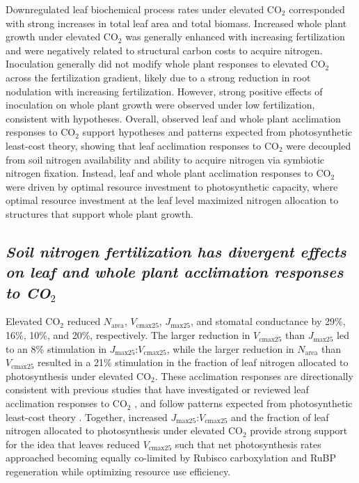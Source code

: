 Downregulated leaf biochemical process rates under elevated CO$_2$ corresponded with strong increases in total leaf area and total biomass. Increased whole plant growth under elevated CO$_2$ was generally enhanced with increasing fertilization and were negatively related to structural carbon costs to acquire nitrogen. Inoculation generally did not modify whole plant responses to elevated CO$_2$ across the fertilization gradient, likely due to a strong reduction in root nodulation with increasing fertilization. However, strong positive effects of inoculation on whole plant growth were observed under low fertilization, consistent with hypotheses. Overall, observed leaf and whole plant acclimation responses to CO$_2$ support hypotheses and patterns expected from photosynthetic least-cost theory, showing that leaf acclimation responses to CO$_2$ were decoupled from soil nitrogen availability and ability to acquire nitrogen via symbiotic nitrogen fixation. Instead, leaf and whole plant acclimation responses to CO$_2$ were driven by optimal resource investment to photosynthetic capacity, where optimal resource investment at the leaf level maximized nitrogen allocation to structures that support whole plant growth.

\begin{singlespace}
    \subsection{\textit{Soil nitrogen fertilization has divergent effects on leaf and whole plant acclimation responses to CO$_2$}}
\end{singlespace}
\noindent Elevated CO$_2$ reduced $N_\mathrm{area}$, $V_\mathrm{cmax25}$, $J_\mathrm{max25}$, and stomatal conductance by 29\%, 16\%, 10\%, and 20\%, respectively. The larger reduction in $V_\mathrm{cmax25}$ than $J_\mathrm{max25}$ led to an 8\% stimulation in $J_\mathrm{max25}$:$V_\mathrm{cmax25}$, while the larger reduction in $N_\mathrm{area}$ than $V_\mathrm{cmax25}$ resulted in a 21\% stimulation in the fraction of leaf nitrogen allocated to photosynthesis under elevated CO$_2$. These acclimation responses are directionally consistent with previous studies that have investigated or reviewed leaf acclimation responses to CO$_2$ , and follow patterns expected from photosynthetic least-cost theory . Together, increased $J_\mathrm{max25}$:$V_\mathrm{cmax25}$ and the fraction of leaf nitrogen allocated to photosynthesis under elevated CO$_2$ provide strong support for the idea that leaves reduced $V_\mathrm{cmax25}$ such that net photosynthesis rates approached becoming equally co-limited by Rubisco carboxylation and RuBP regeneration  while optimizing resource use efficiency.

